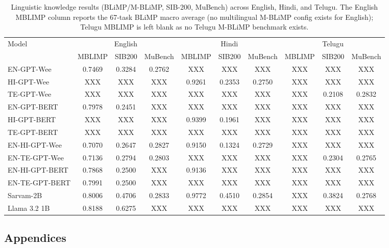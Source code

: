 \documentclass[11pt]{article}
\begin{document}
\begin{table}[t]
\centering
\footnotesize
\begin{tabular}{lccccccccc}
\hline
\multirow{2}{*}{Model} & \multicolumn{3}{c}{English} & \multicolumn{3}{c}{Hindi} &  \multicolumn{3}{c}{Telugu}\\
\cline{2-4} \cline{5-7} \cline{8-10}
 & MBLIMP & SIB200 & MuBench & MBLIMP & SIB200 & MuBench & MBLIMP & SIB200 & MuBench \\
\hline
EN-GPT-Wee & 0.7469 & 0.3284 & 0.2762 & XXX & XXX & XXX & XXX & XXX & XXX \\
HI-GPT-Wee & XXX & XXX & XXX & 0.9261 & 0.2353 & 0.2750 & XXX & XXX & XXX \\
TE-GPT-Wee & XXX & XXX & XXX & XXX & XXX & XXX & XXX & 0.2108 & 0.2832 \\
\hline
EN-GPT-BERT & 0.7978 & 0.2451 & XXX & XXX & XXX & XXX & XXX & XXX & XXX \\
HI-GPT-BERT & XXX & XXX & XXX & 0.9399 & 0.1961 & XXX & XXX & XXX & XXX \\
TE-GPT-BERT & XXX & XXX & XXX & XXX & XXX & XXX & XXX & XXX & XXX \\
\hline
EN-HI-GPT-Wee & 0.7070 & 0.2647 & 0.2827 & 0.9150 & 0.1324 & 0.2729 & XXX & XXX & XXX \\
EN-TE-GPT-Wee & 0.7136 & 0.2794 & 0.2803 & XXX & XXX & XXX & XXX & 0.2304 & 0.2765 \\
EN-HI-GPT-BERT & 0.7868 & 0.2500 & XXX & 0.9136 & XXX & XXX & XXX & XXX & XXX \\
EN-TE-GPT-BERT & 0.7991 & 0.2500 & XXX & XXX & XXX & XXX & XXX & XXX & XXX \\
\hline
Sarvam-2B & 0.8006 & 0.4706 & 0.2833 & 0.9772 & 0.4510 & 0.2854 & XXX & 0.3824 & 0.2768 \\
Llama 3.2 1B & 0.8188 & 0.6275 & XXX & XXX & XXX & XXX & XXX & XXX & XXX \\
\hline
\end{tabular}
\caption{Linguistic knowledge results (BLiMP/M-BLiMP, SIB-200, MuBench) across English, Hindi, and Telugu. The English MBLIMP column reports the 67-task BLiMP macro average (no multilingual M-BLiMP config exists for English); Telugu MBLIMP is left blank as no Telugu M-BLiMP benchmark exists.}
\label{tab:linguistic}
\end{table}

\subsection{Appendices}
\end{document}
